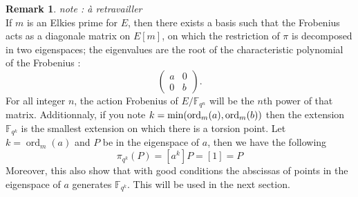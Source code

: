 \documentclass[12pt]{article}
\theoremstyle{plain}
\theoremstyle{definition}
\newtheorem*{remark}{Remark}
\DeclareMathOperator{\order}{ord} %
\def\F{\ensuremath{\mathbb{F}}}
\begin{document}
\begin{remark}
\emph{note : à retravailler}\\
If $m$ is an Elkies prime for $E$, then there exists a basis such that the 
Frobenius acts as a diagonale matrix on $E[m]$, on which the restriction of
$\pi$ is decomposed in two eigenspaces; the eigenvalues are the root of the 
characteristic polynomial of the Frobenius :
\begin{equation}
\begin{pmatrix}
a & 0\\
0 & b
\end{pmatrix}.
\end{equation}
For all integer $n$, the action Frobenius of $E/\F_{q^n}$ will be the $n$th
power of that matrix. Additionnaly, if you note $k =
\textup{min}(\order_m(a),\order_m(b))$ then the extension $\F_{q^k}$ is
the smallest extension on which there is a torsion point. Let $k = \order_m(a)$
and $P$ be in the eigenspace of $a$, then we have the following
\begin{equation}
\pi_{q^k}(P) = [a^k]P = [1] = P
\end{equation}
Moreover, this also show that with good conditions the abscissas of points in the 
eigenspace of $a$ generates $\F_{q^k}$. This will be used in the next
section.
\end{remark}
\end{document}
